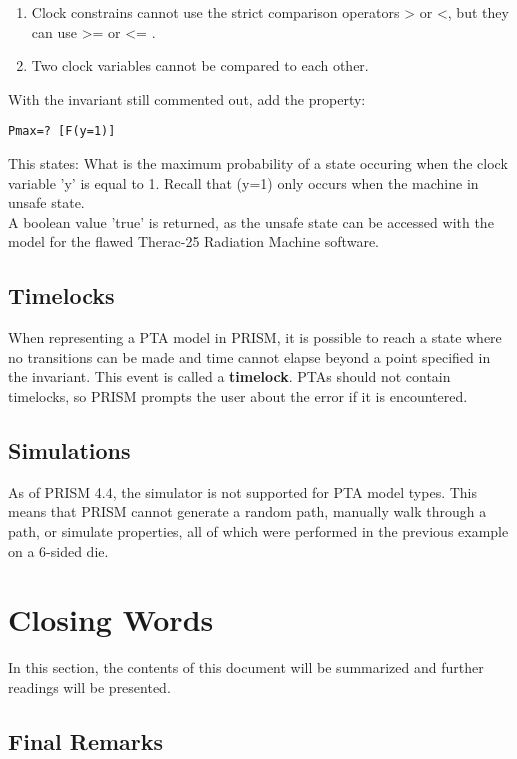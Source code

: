 \documentclass[a4paper]{article}
\begin{document}
\begin{enumerate}
\item Clock constrains cannot use the strict comparison operators > or <, but they can use >= or <= .
\item Two clock variables cannot be compared to each other.
\end{enumerate}

With the invariant still commented out, add the property:

\begin{lstlisting}
Pmax=? [F(y=1)]
\end{lstlisting}

This states: What is the maximum probability of a state occuring when the clock variable 'y' is equal to 1. Recall that (y=1) only occurs when the machine in unsafe state. 
\\[1\baselineskip]
A boolean value 'true' is returned, as the unsafe state can be accessed with the model for the flawed Therac-25 Radiation Machine software.



\subsection{Timelocks}
When representing a PTA model in PRISM, it is possible to reach a state where no transitions can be made and time cannot elapse beyond a point specified in the invariant. This event is called a \textbf{timelock}. PTAs should not contain timelocks, so PRISM prompts the user about the error if it is encountered. 



\subsection{Simulations}
As of PRISM 4.4, the simulator is not supported for PTA model types. This means that PRISM cannot generate a random path, manually walk through a path, or simulate properties, all of which were performed in the previous example on a 6-sided die. 



\section{Closing Words}
In this section, the contents of this document will be summarized and further readings will be presented. 
\subsection{Final Remarks}
\end{document}
